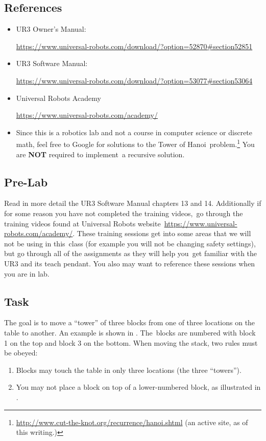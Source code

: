 \subsection{References}
\begin{itemize}
\item UR3 Owner's Manual:

\url{https://www.universal-robots.com/download/?option=52870#section52851}
\item UR3 Software Manual:

\url{https://www.universal-robots.com/download/?option=53077#section53064}
\item Universal Robots Academy

\url{https://www.universal-robots.com/academy/}

\item Since this is a robotics lab and not a course in computer science or discrete math, feel free to Google for solutions to the Tower of Hanoi\
problem.\footnote{\url{http://www.cut-the-knot.org/recurrence/hanoi.shtml} (an active site, as of this writing.)} You are \textbf{NOT} required to implement\
a recursive solution.
\end{itemize}

\subsection{Pre-Lab}
Read in more detail the UR3 Software Manual chapters 13 and 14.  Additionally if for some reason you have not completed the training videos,\
go through the training videos found at Universal Robots website\
\url{https://www.universal-robots.com/academy/}.  These training sessions get into some areas that we will not be using in this\ 
class (for example you will not be changing safety settings), but go through all of the assignments as they will help you\ 
get familiar with the UR3 and its teach pendant.  You also may want to reference these sessions when you are in lab.

\subsection{Task}
The goal is to move a ``tower'' of three blocks from one of three locations on the table to another.  An example is shown in .  The\
blocks are numbered with block 1 on the top and block 3 on the bottom.  When moving the stack, two rules must be obeyed:
\begin{enumerate}
\item Blocks may touch the table in only three locations (the three ``towers'').  
\item You may not place a block on top of a lower-numbered block, as illustrated in \figref{legal1}.
\end{enumerate}

